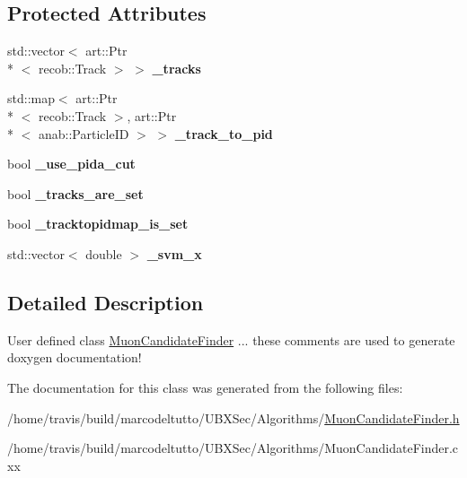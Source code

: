 \subsection*{Protected Attributes}
\begin{DoxyCompactItemize}
\item 
\hypertarget{classubana_1_1MuonCandidateFinder_aa7c96f8b784bcd81512e9c444806f740}{std\-::vector$<$ art\-::\-Ptr\\*
$<$ recob\-::\-Track $>$ $>$ {\bfseries \-\_\-tracks}}\label{classubana_1_1MuonCandidateFinder_aa7c96f8b784bcd81512e9c444806f740}

\item 
\hypertarget{classubana_1_1MuonCandidateFinder_a673e9b7d68a2c3c734fd92ec6e0a87ee}{std\-::map$<$ art\-::\-Ptr\\*
$<$ recob\-::\-Track $>$, art\-::\-Ptr\\*
$<$ anab\-::\-Particle\-I\-D $>$ $>$ {\bfseries \-\_\-track\-\_\-to\-\_\-pid}}\label{classubana_1_1MuonCandidateFinder_a673e9b7d68a2c3c734fd92ec6e0a87ee}

\item 
\hypertarget{classubana_1_1MuonCandidateFinder_a4f0eef92dcbab86d2470da30739be235}{bool {\bfseries \-\_\-use\-\_\-pida\-\_\-cut}}\label{classubana_1_1MuonCandidateFinder_a4f0eef92dcbab86d2470da30739be235}

\item 
\hypertarget{classubana_1_1MuonCandidateFinder_a7275929ef39e422785e7a6dd9d95f5eb}{bool {\bfseries \-\_\-tracks\-\_\-are\-\_\-set}}\label{classubana_1_1MuonCandidateFinder_a7275929ef39e422785e7a6dd9d95f5eb}

\item 
\hypertarget{classubana_1_1MuonCandidateFinder_a46cb4b649e6d2d9b2e6c7641a9fd548a}{bool {\bfseries \-\_\-tracktopidmap\-\_\-is\-\_\-set}}\label{classubana_1_1MuonCandidateFinder_a46cb4b649e6d2d9b2e6c7641a9fd548a}

\item 
\hypertarget{classubana_1_1MuonCandidateFinder_ab09c2e9c8419eb520850e8e8ce3d9518}{std\-::vector$<$ double $>$ {\bfseries \-\_\-svm\-\_\-x}}\label{classubana_1_1MuonCandidateFinder_ab09c2e9c8419eb520850e8e8ce3d9518}

\end{DoxyCompactItemize}


\subsection{Detailed Description}
User defined class \hyperlink{classubana_1_1MuonCandidateFinder}{Muon\-Candidate\-Finder} ... these comments are used to generate doxygen documentation! 

The documentation for this class was generated from the following files\-:\begin{DoxyCompactItemize}
\item 
/home/travis/build/marcodeltutto/\-U\-B\-X\-Sec/\-Algorithms/\hyperlink{MuonCandidateFinder_8h}{Muon\-Candidate\-Finder.\-h}\item 
/home/travis/build/marcodeltutto/\-U\-B\-X\-Sec/\-Algorithms/Muon\-Candidate\-Finder.\-cxx\end{DoxyCompactItemize}
